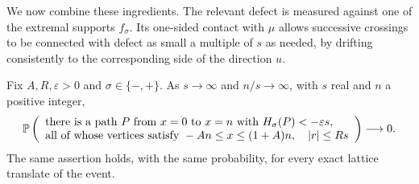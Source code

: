 We now combine these ingredients. The relevant defect is measured against
one of the extremal supports $f_\sigma$. Its one-sided contact with $\mu$
allows successive crossings to be connected with defect as small a multiple
of $s$ as needed, by drifting consistently to the corresponding side of
the direction $u$.

\begin{lemma}\label{df:cr:rare-fast}
Fix $A,R,\varepsilon>0$ and $\sigma\in\{-,+\}$. As $s\to\infty$ and
$n/s\to\infty$, with $s$ real and $n$ a positive integer,
\begin{equation}\label{df:eq:cr-rare-fast}
 \mathbb P\left(
 \begin{array}{l}
 \text{there is a path $P$ from $x=0$ to $x=n$ with}
       \ H_\sigma(P)<-\varepsilon s,\\
 \text{all of whose vertices satisfy }
       -An\le x\le(1+A)n,\quad |r|\le Rs
 \end{array}\right)\longrightarrow0.
\end{equation}
The same assertion holds, with the same probability, for every exact
lattice translate of the event.
\end{lemma}

